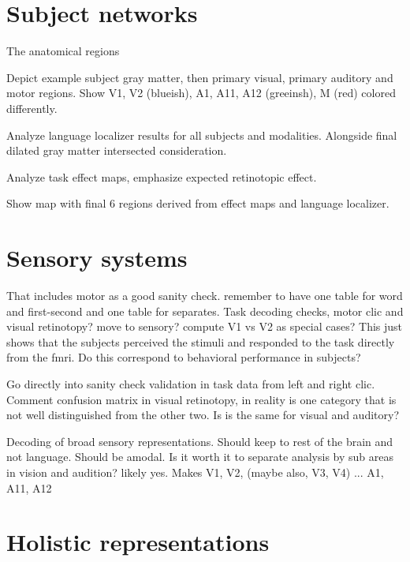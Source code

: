 \section{Subject networks}
%
The anatomical regions 


Depict example subject gray matter, then primary visual, primary auditory and motor regions. Show V1, V2 (blueish), A1, A11, A12 (greeinsh), M (red) colored differently.

Analyze language localizer results for all subjects and modalities. Alongside final dilated gray matter intersected consideration.

Analyze task effect maps, emphasize expected retinotopic effect.

Show map with final 6 regions derived from effect maps and language localizer.


\section{Sensory systems}
%
That includes motor as a good sanity check. remember to have one table for word and first-second and one table for separates. Task decoding checks, motor clic and visual retinotopy? move to sensory? compute V1 vs V2 as special cases? This just shows that the subjects perceived the stimuli and responded to the task directly from the fmri. Do this correspond to behavioral performance in subjects?

Go directly into sanity check validation in task data from left and right clic. Comment confusion matrix in visual retinotopy, in reality is one category that is not well distinguished from the other two. Is is the same for visual and auditory?

Decoding of broad sensory representations. Should keep to rest of the brain and not language. Should be amodal. Is it worth it to separate analysis by sub areas in vision and audition? likely yes. Makes V1, V2, (maybe also, V3, V4) ... A1, A11, A12


\section{Holistic representations}

